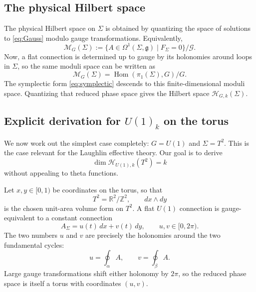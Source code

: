 \documentclass[11pt]{article}
\newcommand{\Z}{\mathbb{Z}}
\newcommand{\R}{\mathbb{R}}
\newcommand{\Hom}{\operatorname{Hom}}
\theoremstyle{definition}
\numberwithin{theorem}{section}
\numberwithin{equation}{section}
\begin{document}
\subsection{The physical Hilbert space}

The physical Hilbert space on $\Sigma$ is obtained by quantizing the space of solutions to \eqref{eq:Gauss} modulo gauge transformations. Equivalently,
\begin{equation}\label{eq:moduli}
\mathcal{M}_G(\Sigma)
:=
\{A\in \Omega^1(\Sigma,\mathfrak{g}) \mid F_\Sigma = 0\}/\mathcal{G}.
\end{equation}
Now, a flat connection is determined up to gauge by its holonomies around loops in $\Sigma$, so the same moduli space can be written as
\begin{equation}\label{eq:moduli-hom}
\mathcal{M}_G(\Sigma) = \Hom(\pi_1(\Sigma),G)/G.
\end{equation}
The symplectic form \eqref{eq:symplectic} descends to this finite-dimensional moduli space. Quantizing that reduced phase space gives the Hilbert space $\mathcal{H}_{G,k}(\Sigma)$.

\subsection{Explicit derivation for $U(1)_k$ on the torus}\label{subsec:U1-torus}

We now work out the simplest case completely: $G=U(1)$ and $\Sigma = T^2$. This is the case relevant for the Laughlin effective theory. Our goal is to derive
\begin{equation}\label{eq:dim-U1-goal}
\dim \mathcal{H}_{U(1),k}(T^2) = k
\end{equation}
without appealing to theta functions.

\medskip

\noindent Let $x,y\in [0,1)$ be coordinates on the torus, so that
\begin{equation*}
T^2 = \R^2/\Z^2,
\qquad
dx\wedge dy
\end{equation*}
is the chosen unit-area volume form on $T^2$. A flat $U(1)$ connection is gauge-equivalent to a constant connection
\begin{equation}\label{eq:torus-flat-connection}
A_\Sigma = u(t)\,dx + v(t)\,dy,
\qquad
u,v\in [0,2\pi).
\end{equation}
The two numbers $u$ and $v$ are precisely the holonomies around the two fundamental cycles:
\begin{equation*}
u = \oint_{\alpha}A,
\qquad
v = \oint_{\beta}A.
\end{equation*}
Large gauge transformations shift either holonomy by $2\pi$, so the reduced phase space is itself a torus with coordinates $(u,v)$.
\end{document}

